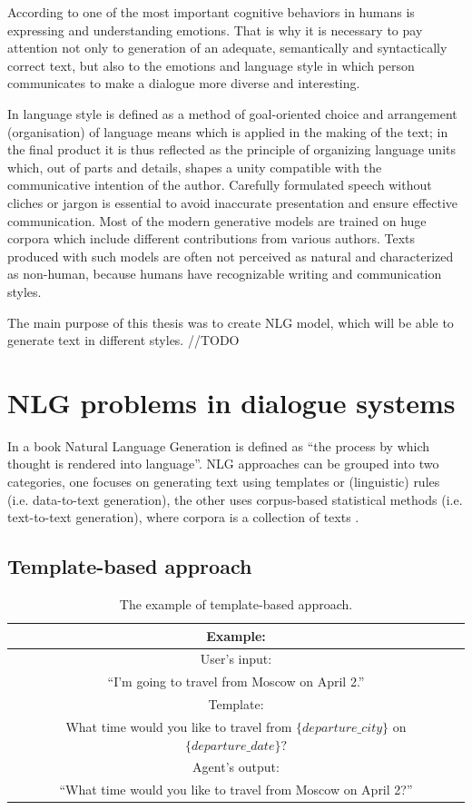 According to \cite{salovey1990emotional} one of the most important cognitive behaviors in humans is expressing and understanding emotions. That is why it is necessary to pay attention not only to generation of an adequate, semantically and syntactically correct text, but also to the emotions and language style in which person communicates to make a dialogue more diverse and interesting. 

In \cite{minavrova2003souvcasna} language style is defined as a method of goal-oriented choice and arrangement (organisation) of language means which is applied in the making of the text; in the final product it is thus reflected as the principle of organizing language units which, out of parts and details, shapes a unity compatible with the communicative intention of the author. Carefully formulated speech without cliches or jargon is essential to avoid inaccurate presentation and ensure effective communication. Most of the modern generative models are trained on huge corpora which include different contributions from various authors. Texts produced with such models are often not perceived as natural and characterized as non-human, because humans have recognizable writing and communication styles.


The main purpose of this thesis was to create NLG model, which will be able to generate text in different styles.  //TODO


\chapter{NLG problems in dialogue systems}\label{nlg_problems}
In a book \cite{alder2017handbook} Natural Language Generation is defined as ``the process by which thought is rendered into language''. NLG approaches can be grouped into two categories, one focuses on generating text using templates or (linguistic) rules (i.e. data-to-text generation), the other uses corpus-based statistical methods (i.e. text-to-text generation), where corpora is a collection of texts \cite{oh2002stochastic}.

\section{Template-based approach} 

\begin{table}[ht]
\centering
 \begin{tabular}{|c|} 
 \hline
 Example: \\
 \hline
 User's input: \\
 ``I'm going to travel from Moscow on April 2.'' \\ 
 \hline
 Template: \\
 What time would you like to travel from $\{departure\_city\}$ on $\{departure\_date\}?$ \\
 \hline
 Agent's output:\\
 ``What time would you like to travel from Moscow on April 2?'' \\
 \hline
 \end{tabular}
 \caption{The example of template-based approach.}
\label{tab:tb_example}
\end{table}

